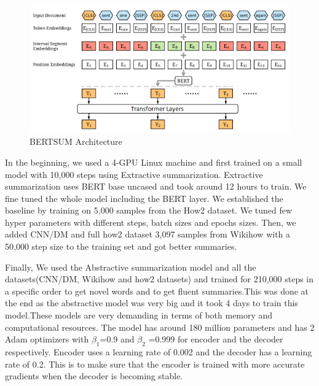\documentclass{article}
\begin{document}
\begin{figure}
  \includegraphics[width=\linewidth]{bertsumarchitecture.png}
  \caption{BERTSUM Architecture}
  \label{fig:architecure}
\end{figure}

In the beginning, we used a 4-GPU Linux machine and first trained on a small model with 10,000 steps using Extractive summarization. Extractive summarization uses BERT base uncased and took around 12 hours to train. We fine tuned the whole model including the BERT layer. We established the baseline by training on 5,000 samples from the How2 dataset. We tuned few hyper parameters with different steps, batch sizes and epochs sizes. Then, we added CNN/DM and full how2 dataset 3,097 samples from Wikihow with a 50,000 step size to the training set and got better summaries. 

Finally, We used the Abstractive summarization model and all the datasets(CNN/DM, Wikihow and how2 datasets) and trained for 210,000 steps in a specific order to get novel words and to get fluent summaries.This was done at the end as the abstractive model was very big and it took 4 days to train this model.These models are very demanding in terms of both memory and computational resources. The model has around 180 million parameters and has 2 Adam optimizers with $\beta_1$=0.9 and $\beta_2$ =0.999 for encoder and the decoder respectively. Encoder uses a learning rate of 0.002 and the decoder has a learning rate of 0.2. This is to make sure that the encoder is trained with more accurate gradients when the decoder is becoming stable.
\end{document}
